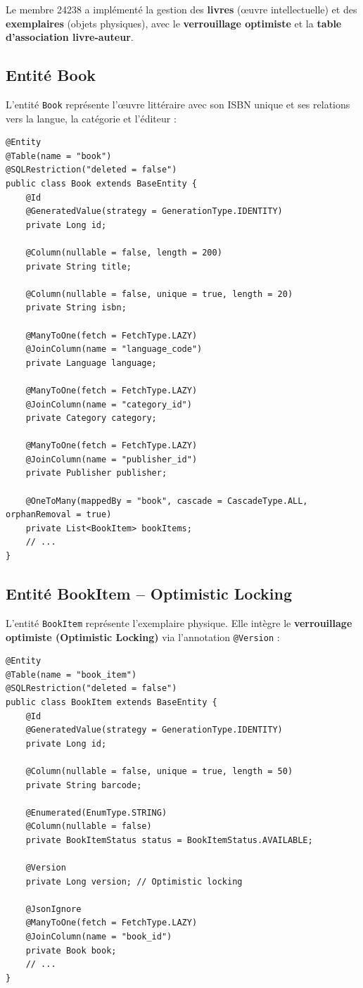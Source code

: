 \documentclass[12pt,a4paper,twoside]{report}
\begin{document}
Le membre 24238 a implémenté la gestion des \textbf{livres} (œuvre intellectuelle) et des \textbf{exemplaires} (objets physiques), avec le \textbf{verrouillage optimiste} et la \textbf{table d'association livre-auteur}.

\subsection{Entité Book}

L'entité \texttt{Book} représente l'œuvre littéraire avec son ISBN unique et ses relations vers la langue, la catégorie et l'éditeur :

\begin{lstlisting}[caption=Entité Book]
@Entity
@Table(name = "book")
@SQLRestriction("deleted = false")
public class Book extends BaseEntity {
    @Id
    @GeneratedValue(strategy = GenerationType.IDENTITY)
    private Long id;

    @Column(nullable = false, length = 200)
    private String title;

    @Column(nullable = false, unique = true, length = 20)
    private String isbn;

    @ManyToOne(fetch = FetchType.LAZY)
    @JoinColumn(name = "language_code")
    private Language language;

    @ManyToOne(fetch = FetchType.LAZY)
    @JoinColumn(name = "category_id")
    private Category category;

    @ManyToOne(fetch = FetchType.LAZY)
    @JoinColumn(name = "publisher_id")
    private Publisher publisher;

    @OneToMany(mappedBy = "book", cascade = CascadeType.ALL, orphanRemoval = true)
    private List<BookItem> bookItems;
    // ...
}
\end{lstlisting}

\subsection{Entité BookItem -- Optimistic Locking}

L'entité \texttt{BookItem} représente l'exemplaire physique. Elle intègre le \textbf{verrouillage optimiste (Optimistic Locking)} via l'annotation \texttt{@Version} :

\begin{lstlisting}[caption=BookItem avec Optimistic Locking et JsonIgnore]
@Entity
@Table(name = "book_item")
@SQLRestriction("deleted = false")
public class BookItem extends BaseEntity {
    @Id
    @GeneratedValue(strategy = GenerationType.IDENTITY)
    private Long id;

    @Column(nullable = false, unique = true, length = 50)
    private String barcode;

    @Enumerated(EnumType.STRING)
    @Column(nullable = false)
    private BookItemStatus status = BookItemStatus.AVAILABLE;

    @Version
    private Long version; // Optimistic locking

    @JsonIgnore
    @ManyToOne(fetch = FetchType.LAZY)
    @JoinColumn(name = "book_id")
    private Book book;
    // ...
}
\end{lstlisting}
\end{document}
